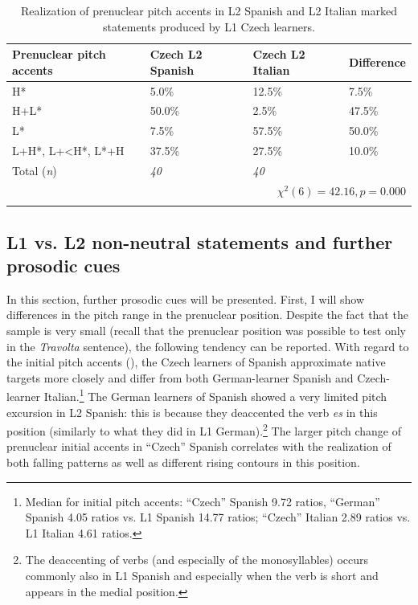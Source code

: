 \begin{table}
\begin{tabularx}{\textwidth}{lYYY}

\lsptoprule

{Prenuclear pitch accents} & {Czech L2 Spanish} & {Czech L2 Italian} & {Difference}\\
\midrule
H* &  5.0\% &  12.5\% &  7.5\%\\
H+L* &  50.0\% &  2.5\% &  47.5\%\\
L* &  7.5\% &  57.5\% &  50.0\%\\
L+H*, L+<H*, L*+H &  37.5\% &  27.5\% &  10.0\%\\
\midrule
Total (\textit{n}) & {\itshape 40} & {\itshape 40} &  \\
\\
\lspbottomrule
\end{tabularx}

\caption{Realization of prenuclear pitch accents in L2 Spanish and L2 Italian marked statements produced by L1 Czech learners.}
\label{tab:4.16}
\end{table}

\subsection{L1 vs. L2 non-neutral statements and further prosodic cues}\label{sec:4.2.4}

In this section, further prosodic cues will be presented. First, I will show differences in the pitch range in the prenuclear position. Despite the fact that the sample is very small (recall that the prenuclear position was possible to test only in the \textit{Travolta}{} sentence), the following tendency can be reported. With regard to the initial pitch accents (), the Czech learners of Spanish approximate native targets more closely and differ from both German-learner Spanish and Czech-learner Italian.\footnote{Median for initial pitch accents: “Czech” Spanish 9.72 ratios, “German” Spanish 4.05 ratios vs. L1 Spanish 14.77 ratios; “Czech” Italian 2.89 ratios vs. L1 Italian 4.61 ratios.} The German learners of Spanish showed a very limited pitch excursion in L2 Spanish: this is because they deaccented the verb \textit{es} in this position (similarly to what they did in L1 German).\footnote{The deaccenting of verbs (and especially of the monosyllables) occurs commonly also in L1 Spanish and especially when the verb is short and appears in the medial position.} The larger pitch change of prenuclear initial accents in “Czech” Spanish correlates with the realization of both falling patterns as well as different rising contours in this position.

